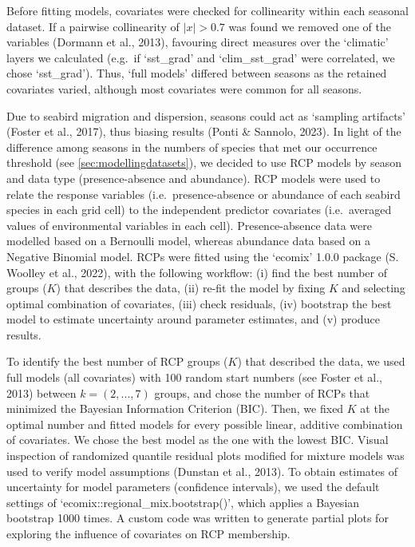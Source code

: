 \documentclass{article}
\begin{document}
Before fitting models, covariates were checked for collinearity within
each seasonal dataset. If a pairwise collinearity of
\(\left|x\right| >0.7\) was found we removed one of the variables
(Dormann et al., 2013), favouring direct measures over the `climatic'
layers we calculated (e.g.~if `sst\_grad' and `clim\_sst\_grad' were
correlated, we chose `sst\_grad'). Thus, `full models' differed between
seasons as the retained covariates varied, although most covariates were
common for all seasons.

Due to seabird migration and dispersion, seasons could act as `sampling
artifacts' (Foster et al., 2017), thus biasing results (Ponti \&
Sannolo, 2023). In light of the difference among seasons in the numbers
of species that met our occurrence threshold (see
\ref{sec:modellingdatasets}), we decided to use RCP models by season and
data type (presence-absence and abundance). RCP models were used to
relate the response variables (i.e.~presence-absence or abundance of
each seabird species in each grid cell) to the independent predictor
covariates (i.e.~averaged values of environmental variables in each
cell). Presence-absence data were modelled based on a Bernoulli model,
whereas abundance data based on a Negative Binomial model. RCPs were
fitted using the `ecomix' 1.0.0 package (S. Woolley et al., 2022), with
the following workflow: (i) find the best number of groups (\(K\)) that
describes the data, (ii) re-fit the model by fixing \(K\) and selecting
optimal combination of covariates, (iii) check residuals, (iv) bootstrap
the best model to estimate uncertainty around parameter estimates, and
(v) produce results.

To identify the best number of RCP groups (\(K\)) that described the
data, we used full models (all covariates) with 100 random start numbers
(see Foster et al., 2013) between \(k = (2, ..., 7)\) groups, and chose
the number of RCPs that minimized the Bayesian Information Criterion
(BIC). Then, we fixed \(K\) at the optimal number and fitted models for
every possible linear, additive combination of covariates. We chose the
best model as the one with the lowest BIC. Visual inspection of
randomized quantile residual plots modified for mixture models was used
to verify model assumptions (Dunstan et al., 2013). To obtain estimates
of uncertainty for model parameters (confidence intervals), we used the
default settings of `ecomix::regional\_mix.bootstrap()', which applies a
Bayesian bootstrap 1000 times. A custom code was written to generate
partial plots for exploring the influence of covariates on RCP
membership.
\end{document}
